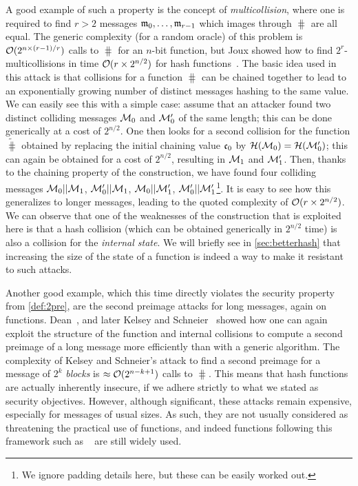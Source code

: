 A good example of such a property is the concept of \emph{multicollision}, where one is required to find $r > 2$ messages $\mathfrak{m}_{0},\ldots,\mathfrak{m}_{r-1}$ which images through $\hash$
are all equal. The generic complexity (\eg for a random oracle) of this problem is $\operatorname{\mathcal{O}}(2^{n\times (r-1)/r})$ calls to $\hash$ for an $n$-bit function, but Joux showed how to
find $2^r$-multicollisions in time $\operatorname{\mathcal{O}}(r\times 2^{n/2})$ for \merkdam hash functions~\cite{DBLP:conf/crypto/Joux04}.
The basic idea used in this attack is that collisions for a \merkdam function $\hash$ can be chained together to lead to an exponentially growing number of distinct messages hashing
to the same value. We can easily see this with a simple case: assume that an attacker found two distinct colliding messages $\mathcal{M}_0$ and $\mathcal{M}'_0$ of the same length;
this can be done generically at a cost of $2^{n/2}$. One then looks for a second collision for the function $\widetilde \hash$ obtained by replacing the initial chaining
value $\mathfrak{c}_0$ by $\operatorname{\mathcal{H}}(\mathcal{M}_0) = \operatorname{\mathcal{H}}(\mathcal{M}'_0)$; this can again be obtained for a cost of $2^{n/2}$, resulting in $\mathcal{M}_1$ and $\mathcal{M}'_1$. Then, thanks to
the chaining property of the \merkdam construction, we have found four colliding messages $\mathcal{M}_0||\mathcal{M}_1$, $\mathcal{M}'_0||\mathcal{M}_1$, $\mathcal{M}_0||\mathcal{M}'_1$, $\mathcal{M}'_0||\mathcal{M}'_1$\footnote{We ignore
padding details here, but these can be easily worked out.}. It is easy to see how this generalizes to longer messages, leading to the quoted complexity of $\operatorname{\mathcal{O}}(r \times 2^{n/2})$.
We can observe that one of the weaknesses of the construction that is exploited here is that a hash collision (which can be obtained generically in $2^{n/2}$ time) is also
a collision for the \emph{internal state}. We will briefly see in \autoref{sec:betterhash} that increasing the size of the state of a function is indeed a way to make it resistant
to such attacks.

Another good example, which this time directly violates the security property from \autoref{def:2pre}, are the second preimage attacks for long messages, again on \merkdam functions.
Dean~\cite{}, and later Kelsey and Schneier~\cite{} showed how one can again exploit the structure of the function and internal collisions to compute a second preimage
of a long message more efficiently than with a generic algorithm. The complexity of Kelsey and Schneier's attack to find a second preimage for a message
of $2^k$ \emph{blocks} is $\approx \operatorname{\mathcal{O}}(2^{n-k+1})$ calls to $\hash$. This means that \merkdam hash functions are actually inherently insecure, if we adhere
strictly to what we stated as security objectives. However, although significant, these attacks remain expensive, especially for messages of usual sizes. As such, they are not usually considered as threatening
the practical use of \merkdam functions, and indeed functions following this framework such as \shatwo~\cite{Nist-SHA} are still widely used.

